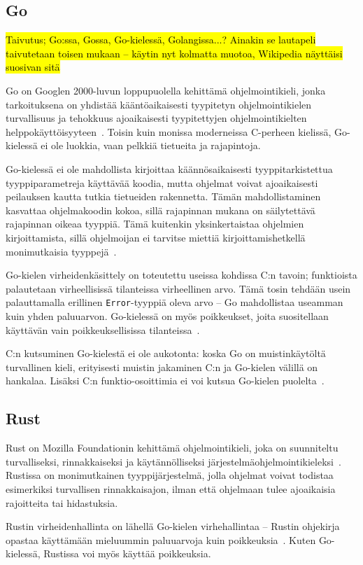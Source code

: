 \subsection{Go}

\hl{Taivutus; Go:ssa, Gossa, Go-kielessä, Golangissa...? Ainakin se lautapeli
taivutetaan toisen mukaan -- käytin nyt kolmatta muotoa, Wikipedia näyttäisi
suosivan sitä}

Go on Googlen 2000-luvun loppupuolella kehittämä ohjelmointikieli, jonka
tarkoituksena on yhdistää kääntöaikaisesti tyypitetyn ohjelmointikielen
turvallisuus ja tehokkuus ajoaikaisesti tyypitettyjen ohjelmointikielten
helppokäyttöisyyteen~\citep{gohistory}. Toisin kuin monissa moderneissa
C-perheen kielissä, Go-kielessä ei ole luokkia, vaan pelkkiä tietueita ja
rajapintoja.

Go-kielessä ei ole mahdollista kirjoittaa käännösaikaisesti tyyppitarkistettua
tyyppiparametreja käyttävää koodia, mutta ohjelmat voivat ajoaikaisesti
peilauksen kautta tutkia tietueiden rakennetta.
Tämän mahdollistaminen kasvattaa ohjelmakoodin kokoa, sillä rajapinnan mukana
on säilytettävä rajapinnan oikeaa tyyppiä. Tämä kuitenkin yksinkertaistaa
ohjelmien kirjoittamista, sillä ohjelmoijan ei tarvitse miettiä
kirjoittamishetkellä monimutkaisia tyyppejä~\citep[esim.][kalvo 8]{gohistory}.

Go-kielen virheidenkäsittely on toteutettu useissa kohdissa C:n tavoin;
funktioista palautetaan virheellisissä tilanteissa virheellinen arvo. Tämä
tosin tehdään usein palauttamalla erillinen \texttt{Error}-tyyppiä oleva arvo
-- Go mahdollistaa useamman kuin yhden paluuarvon. Go-kielessä on myös
poikkeukset, joita suositellaan käyttävän vain poikkeuksellisissa
tilanteissa~\citep{effectivego}.

C:n kutsuminen Go-kielestä ei ole aukotonta: koska Go on muistinkäytöltä
turvallinen kieli, erityisesti muistin jakaminen C:n ja Go-kielen välillä on
hankalaa. Lisäksi C:n funktio-osoittimia ei voi kutsua Go-kielen
puolelta~\citep{cgo}.

\subsection{Rust}

Rust on Mozilla Foundationin kehittämä ohjelmointikieli, joka on suunniteltu
turvalliseksi, rinnakkaiseksi ja käytännölliseksi
järjestelmäohjelmointikieleksi~\citep{rustfaq}. Rustissa on monimutkainen
tyyppijärjestelmä, jolla ohjelmat voivat todistaa esimerkiksi turvallisen
rinnakkaisajon, ilman että ohjelmaan tulee ajoaikaisia rajoitteita tai
hidastuksia.

Rustin virheidenhallinta on lähellä Go-kielen virhehallintaa -- Rustin
ohjekirja opastaa käyttämään mieluummin paluuarvoja kuin
poikkeuksia~\citep{rusterrorhandling}. Kuten Go-kielessä, Rustissa voi myös
käyttää poikkeuksia.
